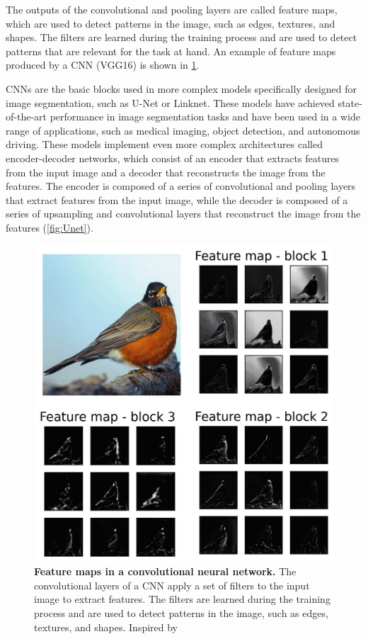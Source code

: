 The outputs of the convolutional and pooling layers are called feature maps,
which are used to detect patterns in the image, such as edges, textures, and
shapes. The filters are learned during the training process and are used to
detect patterns that are relevant for the task at hand. An example of feature
maps produced by a CNN (VGG16) is shown in \cref{fig:feature_maps}.

CNNs are the basic blocks used in more complex models specifically designed
for image segmentation, such as U-Net or Linknet. These models have achieved
state-of-the-art performance in image segmentation tasks and have been used
in
a wide range of applications, such as medical imaging, object detection, and
autonomous driving. These models implement even more complex architectures
called encoder-decoder networks, which consist of an encoder that extracts
features from the input image and a decoder that reconstructs the image from
the features. The encoder is composed of a series of convolutional and
pooling
layers that extract features from the input image, while the decoder is
composed of a series of upsampling and convolutional layers that reconstruct
the image from the features (\cref{fig:Unet}).

\begin{figure}[H]
  \centering
  \includegraphics[width=1\textwidth]{Figures/feature_maps.pdf}
  \caption[Feature maps in a convolutional neural network]{
    \textbf{Feature maps in a convolutional neural network.} The
    convolutional
    layers of a CNN apply a set of filters to the input image to extract
    features. The filters are learned during the training process and are
    used
    to detect patterns in the image, such as edges, textures, and shapes.
    Inspired by \cite{Brownlee2019}}
  \label{fig:feature_maps}
\end{figure}

